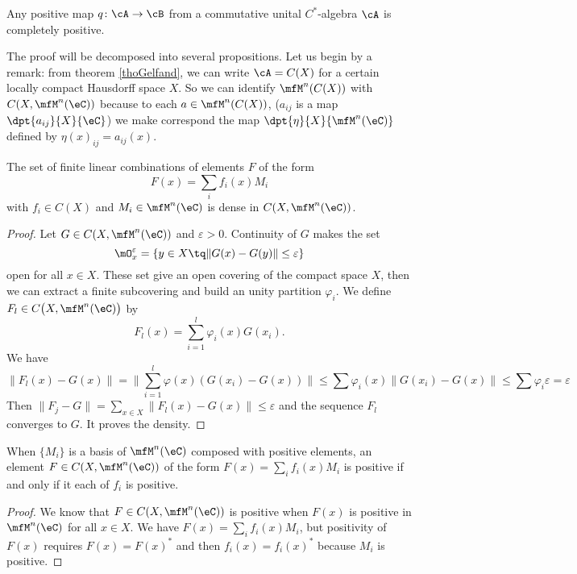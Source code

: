 \begin{proposition}
Any positive map $q\colon \cA\to \cB$ from a commutative unital $C^*$-algebra $\cA$ is completely positive.
\end{proposition}

The proof will be decomposed into several propositions. Let us begin by a remark: from theorem \ref{thoGelfand}, we can write $\cA=C(X)$ for a certain locally compact Hausdorff space $X$. So we can identify $\mfM^n(C(X))$ with $C(X,\mfM^n(\eC))$ because to each $a\in\mfM^n(C(X))$, ($a_{ij}$ is a map $\dpt{ a_{ij} }{ X }{ \eC }$) we make correspond the map $\dpt{ \eta }{ X }{ \mfM^n(\eC) }$ defined by $\eta(x)_{ij}=a_{ij}(x)$.


\begin{proposition}
The set of finite linear combinations of elements $F$ of the form
\[ 
  F(x)=\sum_i f_i(x)M_i
\]
with $f_i\in C(X)$ and $M_i\in\mfM^n(\eC)$ is dense in $C(X,\mfM^n(\eC))$.
 \label{prop:lencombpart}
\end{proposition}


\begin{proof}
Let $G\in C(X,\mfM^n(\eC))$ and $\varepsilon>0$. Continuity of $G$ makes the set
\[ 
  \mO_x^{\varepsilon}=\{ y\in X\tq \| G(x)-G(y) \|\leq\varepsilon \}
\]
open for all $x\in X$. These set give an open covering of the compact space $X$, then we can extract a finite subcovering and build an unity partition $\varphi_i$. We define $F_l\in C\big( X,\mfM^n(\eC) \big)$ by
\begin{equation} \label{eq:Fllim}
  F_l(x)=\sum_{i=1}^l\varphi_i(x)G(x_i).
\end{equation}
We have
\begin{equation}
\| F_l(x)-G(x) \|=\| \sum_{i=1}^l\varphi(x)( G(x_i)-G(x) ) \|
        \leq \sum \varphi_i(x)\| G(x_i)-G(x) \|
        \leq \sum\varphi_i\varepsilon
    =\varepsilon
\end{equation}
Then $\| F_j-G \|=\sum_{x\in X}\| F_l(x)-G(x) \|\leq\varepsilon$ and the sequence $F_l$ converges to $G$. It proves the density.
\end{proof}


\begin{proposition}
When $\{ M_i \}$ is a basis of $\mfM^n(\eC)$ composed with positive elements, an element $F\in C(X,\mfM^n(\eC))$ of the form $F(x)=\sum_if_i(x)M_i$ is positive if and only if it each of $f_i$ is positive.
\end{proposition}

\begin{proof}
We know that $F\in C(X,\mfM^n(\eC))$ is positive when $F(x)$ is positive in $\mfM^n(\eC)$ for all $x\in X$. We have $F(x)=\sum_if_i(x)M_i$, but positivity of $F(x)$ requires $F(x)=F(x)^*$ and then $f_i(x)=f_i(x)^*$ because $M_i$ is positive.

\end{proof}

